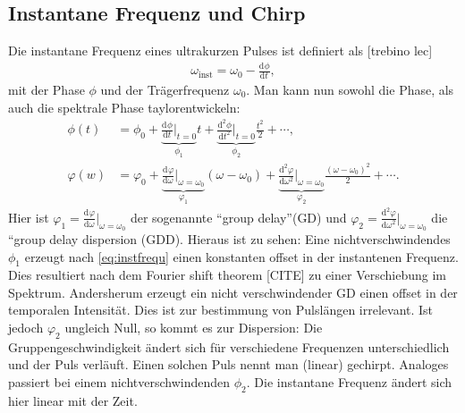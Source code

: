 \documentclass[twoside,        %
               BCOR12mm,       %
               english,ngerman, %
               fleqn,headsepline=false,footsepline=false
              ]{Vorlage/MFPREPORT}
\renewcommand{\d}{\ensuremath{\mathrm{d}}} %
\newcommand{\diff}[3][]{\ensuremath{\frac{\d^{#1}#2}{\d#3^{#1}}}} %
\begin{document}
\subsection{Instantane Frequenz und Chirp}
Die instantane Frequenz eines ultrakurzen Pulses ist definiert als [trebino lec]
\begin{align}
    \omega_{\text{inst}}=\omega_0-\diff{\phi}{t},
    \label{eq:instfrequ}
\end{align}
mit der Phase $\phi$ und der Trägerfrequenz $\omega_0$. Man kann nun sowohl die Phase, als auch die spektrale Phase taylorentwickeln: 
\begin{align}
    \phi(t)&=\phi_0+\underbrace{\diff{\phi}{t}|_{t=0}}_{\phi_1}t+\underbrace{\diff[2]{\phi}{t}|_{t=0}}_{\phi_2}\frac{t^2}{2}+\cdots,\\
    \varphi(w)&=\varphi_0+\underbrace{\diff{\varphi}{\omega}|_{\omega=\omega_0}}_{\varphi_1}(\omega-\omega_0)+\underbrace{\diff[2]{\varphi}{\omega}|_{\omega=\omega_0}}_{\varphi_2}\frac{(\omega-\omega_0)^2}{2}+\cdots.
    \label{eq:taylor}
\end{align}
Hier ist $\varphi_1=\diff{\varphi}{\omega}|_{\omega=\omega_0}$ der sogenannte
``group delay''(GD) und
$\varphi_2=\diff[2]{\varphi}{\omega}|_{\omega=\omega_0}$ die ``group delay
dispersion (GDD). Hieraus ist zu sehen: Eine nichtverschwindendes $\phi_1$
erzeugt nach \cref{eq:instfrequ} einen konstanten offset in der instantenen
Frequenz. Dies resultiert nach dem Fourier shift theorem [CITE] zu einer
Verschiebung im Spektrum. Andersherum erzeugt ein nicht verschwindender GD
einen offset in der temporalen Intensität. Dies ist zur bestimmung von
Pulslängen irrelevant. Ist jedoch $\varphi_2$ ungleich Null, so kommt es zur
Dispersion: Die Gruppengeschwindigkeit ändert sich für verschiedene Frequenzen
unterschiedlich und der Puls verläuft. Einen solchen Puls nennt man (linear) gechirpt. Analoges passiert bei einem nichtverschwindenden $\phi_2$. Die instantane Frequenz ändert sich hier linear mit der Zeit.
\end{document}
